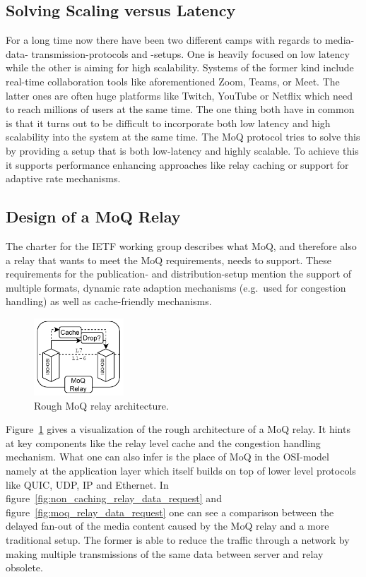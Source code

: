 \subsection{Solving Scaling versus Latency}
For a long time now there have been two different camps with regards to media-data-
transmission-protocols and -setups.
One is heavily focused on low latency while the other is aiming for high scalability.
Systems of the former kind include real-time collaboration tools like aforementioned
Zoom, Teams, or Meet.
The latter ones are often huge platforms like Twitch, YouTube or Netflix which need to 
reach millions of users at the same time.
The one thing both have in common is that it turns out to be difficult to incorporate both 
low latency and high scalability into the system at the same time.
The MoQ protocol tries to solve this by providing a setup that is both low-latency and
highly scalable.
To achieve this it supports performance enhancing approaches like relay caching or support 
for adaptive rate mechanisms. %

\subsection{Design of a MoQ Relay}
The charter for the IETF working group describes what MoQ, and therefore also a relay 
that wants to meet the MoQ requirements, needs to support.
These requirements for the publication- and distribution-setup mention the support of 
multiple formats, dynamic rate adaption mechanisms (e.g.~used for congestion handling)
as well as cache-friendly mechanisms.

\begin{figure}
    \centering
    \includegraphics[width=0.3\textwidth]{figures/02_background/moq-relay.drawio.pdf}
    \caption[Rough MoQ relay architecture]{Rough MoQ relay architecture.}\label{fig:moq_relay_architecture}
\end{figure}

Figure~\ref{fig:moq_relay_architecture} gives a visualization of the rough architecture
of a MoQ relay.
It hints at key components like the relay level cache and the congestion handling
mechanism.
What one can also infer is the place of MoQ in the OSI-model namely at the application
layer which itself builds on top of lower level protocols like QUIC, UDP, IP and Ethernet.
In figure~\ref{fig:non_caching_relay_data_request} and figure~\ref{fig:moq_relay_data_request} 
one can see a comparison between the delayed fan-out of the media content caused by the MoQ 
relay and a more traditional setup.
The former is able to reduce the traffic through a network by making multiple transmissions
of the same data between server and relay obsolete.

